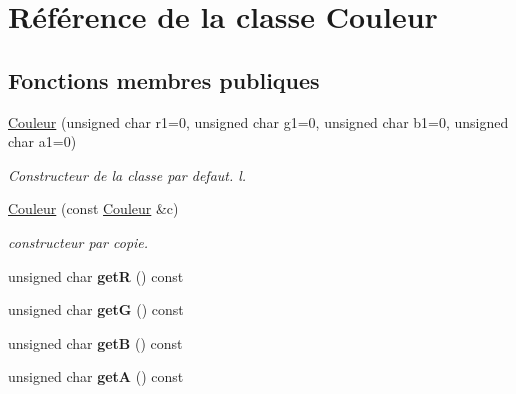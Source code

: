 \hypertarget{class_couleur}{}\section{Référence de la classe Couleur}
\label{class_couleur}
\subsection*{Fonctions membres publiques}
\begin{DoxyCompactItemize}
\item 
\mbox{\label{class_couleur_a28518b7bfd4763ac8ef0ca17e0224c91}} 
\mbox{\hyperlink{class_couleur_a28518b7bfd4763ac8ef0ca17e0224c91}{Couleur}} (unsigned char r1=0, unsigned char g1=0, unsigned char b1=0, unsigned char a1=0)
\begin{DoxyCompactList}\small\item\em Constructeur de la classe par defaut. l. \end{DoxyCompactList}\item 
\mbox{\label{class_couleur_a6ab9333943680ad98c433a57f40fd3fa}} 
\mbox{\hyperlink{class_couleur_a6ab9333943680ad98c433a57f40fd3fa}{Couleur}} (const \mbox{\hyperlink{class_couleur}{Couleur}} \&c)
\begin{DoxyCompactList}\small\item\em constructeur par copie. \end{DoxyCompactList}\item 
\mbox{\label{class_couleur_a0fd22e48a74e0a882d38b34a26aca5e1}} 
unsigned char {\bfseries getR} () const
\item 
\mbox{\label{class_couleur_a5799cf0b1a02cfbee5be98ad08d21c04}} 
unsigned char {\bfseries getG} () const
\item 
\mbox{\label{class_couleur_ae44793a930c085a7278ea60a4c1187e3}} 
unsigned char {\bfseries getB} () const
\item 
\mbox{\label{class_couleur_a8183f8e4051cf041c56513da9fe19b0e}} 
unsigned char {\bfseries getA} () const
\item 
\mbox{\label{class_couleur_a23da08cb15c47fa0fad10bf32c8e61c8}} 

\end{DoxyCompactItemize}

